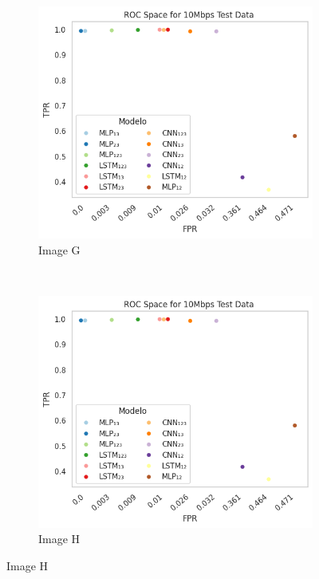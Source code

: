 \documentclass[a4paper,fleqn]{cas-sc}
\begin{document}
\begin{figure}
\begin{minipage}[t]{0.46\textwidth}
			\begin{subfigure}[t]{0.33\textwidth}
			\includegraphics[draft=false, width=\textwidth]{./figs/ROC-Space-Test-Data-10Mbps.png} 
				\caption{Image G}
				\label{fig:1a}
			\end{subfigure}%
			~
			\begin{subfigure}[t]{0.33\textwidth}
				\includegraphics[draft=false, width=\textwidth]{./figs/ROC-Space-Test-Data-10Mbps.png} 
				\caption{Image H}
			\label{fig:2a}
			\end{subfigure}%

\end{minipage}
\end{figure}
\end{document}
